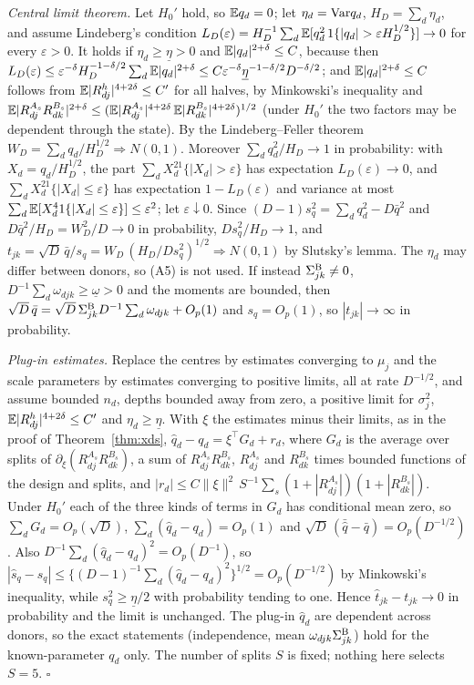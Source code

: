 \emph{Central limit theorem.} Let $H_0'$ hold, so $\mathbb{E} q_d=0$; let $\eta_d=\mathrm{Var} q_d$, $H_D=\sum_d\eta_d$, and assume Lindeberg's condition $L_D(\varepsilon)=H_D^{-1}\sum_d\E[q_d^2\,1\{|q_d|>\varepsilon H_D^{1/2}\}]\to0$ for every $\varepsilon>0$. It holds if $\eta_d\ge\underline\eta>0$ and $\mathbb{E}|q_d|^{2+\delta}\le C$, because then $L_D(\varepsilon)\le\varepsilon^{-\delta}H_D^{-1-\delta/2}\sum_d\mathbb{E}|q_d|^{2+\delta}\le C\varepsilon^{-\delta}\underline\eta^{-1-\delta/2}D^{-\delta/2}$; and $\mathbb{E}|q_d|^{2+\delta}\le C$ follows from $\mathbb{E}|R^h_{dj}|^{4+2\delta}\le C'$ for all halves, by Minkowski's inequality and $\mathbb{E}|R^{A_s}_{dj}R^{B_s}_{dk}|^{2+\delta}\le(\mathbb{E}|R^{A_s}_{dj}|^{4+2\delta}\,\mathbb{E}|R^{B_s}_{dk}|^{4+2\delta})^{1/2}$ (under $H_0'$ the two factors may be dependent through the state). By the Lindeberg--Feller theorem $W_D=\sum_dq_d/H_D^{1/2}\Rightarrow N(0,1)$. Moreover $\sum_dq_d^2/H_D\to1$ in probability: with $X_d=q_d/H_D^{1/2}$, the part $\sum_dX_d^21\{|X_d|>\varepsilon\}$ has expectation $L_D(\varepsilon)\to0$, and $\sum_dX_d^21\{|X_d|\le\varepsilon\}$ has expectation $1-L_D(\varepsilon)$ and variance at most $\sum_d\mathbb{E}[X_d^41\{|X_d|\le\varepsilon\}]\le\varepsilon^2$; let $\varepsilon\downarrow0$. Since $(D-1)s_q^2=\sum_dq_d^2-D\bar q^2$ and $D\bar q^2/H_D=W_D^2/D\to0$ in probability, $Ds_q^2/H_D\to1$, and $t_{jk}=\sqrt D\,\bar q/s_q=W_D\,(H_D/Ds_q^2)^{1/2}\Rightarrow N(0,1)$ by Slutsky's lemma. The $\eta_d$ may differ between donors, so (A5) is not used. If instead $\Sigma^{\mathrm{B}}_{jk}\neq0$, $D^{-1}\sum_d\omega_{djk}\ge\underline\omega>0$ and the moments are bounded, then $\sqrt D\,\bar q=\sqrt D\,\Sigma^{\mathrm{B}}_{jk}D^{-1}\sum_d\omega_{djk}+O_p(1)$ and $s_q=O_p(1)$, so $|t_{jk}|\to\infty$ in probability.

\emph{Plug-in estimates.} Replace the centres by estimates converging to $\mu_j$ and the scale parameters by estimates converging to positive limits, all at rate $D^{-1/2}$, and assume bounded $n_d$, depths bounded away from zero, a positive limit for $\sigma_j^2$, $\mathbb{E}|R^h_{dj}|^{4+2\delta}\le C'$ and $\eta_d\ge\underline\eta$. With $\xi$ the estimates minus their limits, as in the proof of Theorem~\ref{thm:xds}, $\hat q_d-q_d=\xi^\top G_d+r_d$, where $G_d$ is the average over splits of $\partial_\xi(R^{A_s}_{dj}R^{B_s}_{dk})$, a sum of $R^{A_s}_{dj}R^{B_s}_{dk}$, $R^{A_s}_{dj}$ and $R^{B_s}_{dk}$ times bounded functions of the design and splits, and $|r_d|\le C\|\xi\|^2\,S^{-1}\sum_s(1+|R^{A_s}_{dj}|)(1+|R^{B_s}_{dk}|)$. Under $H_0'$ each of the three kinds of terms in $G_d$ has conditional mean zero, so $\sum_dG_d=O_p(\sqrt D)$, $\sum_d(\hat q_d-q_d)=O_p(1)$ and $\sqrt D\,(\bar{\hat q}-\bar q)=O_p(D^{-1/2})$. Also $D^{-1}\sum_d(\hat q_d-q_d)^2=O_p(D^{-1})$, so $|\hat s_q-s_q|\le\{(D-1)^{-1}\sum_d(\hat q_d-q_d)^2\}^{1/2}=O_p(D^{-1/2})$ by Minkowski's inequality, while $s_q^2\ge\underline\eta/2$ with probability tending to one. Hence $\hat t_{jk}-t_{jk}\to0$ in probability and the limit is unchanged. The plug-in $\hat q_d$ are dependent across donors, so the exact statements (independence, mean $\omega_{djk}\Sigma^{\mathrm{B}}_{jk}$) hold for the known-parameter $q_d$ only. The number of splits $S$ is fixed; nothing here selects $S=5$. $\square$

